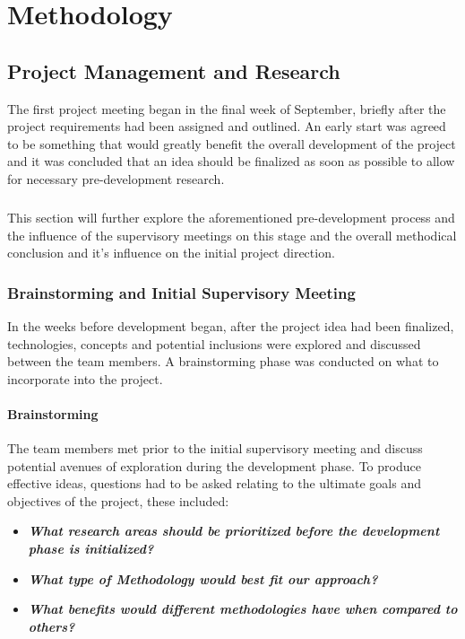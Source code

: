 \chapter{Methodology}

\section{Project Management and Research}
The first project meeting began in the final week of September, briefly after the project requirements had been assigned and outlined. An early start was agreed to be something that would greatly benefit the overall development of the project and it was concluded that an idea should be finalized as soon as possible to allow for necessary pre-development research.

\paragraph{}
This section will further explore the aforementioned pre-development process and the influence of the supervisory meetings on this stage and the overall methodical conclusion and it's influence on the initial project direction.

\subsection{Brainstorming and Initial Supervisory Meeting}
In the weeks before development began, after the project idea had been finalized, technologies, concepts and potential inclusions were explored and discussed between the team members. A brainstorming phase was conducted on what to incorporate into the project.

\subsubsection{Brainstorming}
The team members met prior to the initial supervisory meeting and discuss potential avenues of exploration during the development phase. To produce effective ideas, questions had to be asked relating to the ultimate goals and objectives of the project, these included:

\begin{itemize}
    \item\textit{\textbf{What research areas should be prioritized before the development phase is initialized?}}
    \item\textit{\textbf{What type of Methodology would best fit our approach?}}
    \item\textit{\textbf{What benefits would different methodologies have when compared to others?}}
\end{itemize}

